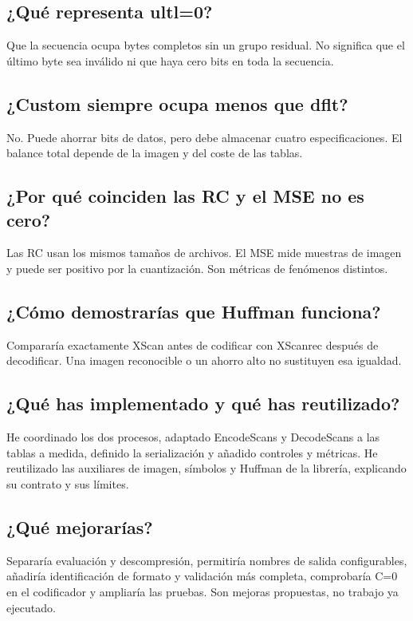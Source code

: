 \documentclass[11pt,a4paper,oneside]{report}
\begin{document}
\subsection{¿Qué representa ultl=0?}
Que la secuencia ocupa bytes completos sin un grupo residual. No significa que el último byte sea inválido ni que haya cero bits en toda la secuencia.

\subsection{¿Custom siempre ocupa menos que dflt?}
No. Puede ahorrar bits de datos, pero debe almacenar cuatro especificaciones. El balance total depende de la imagen y del coste de las tablas.

\subsection{¿Por qué coinciden las RC y el MSE no es cero?}
Las RC usan los mismos tamaños de archivos. El MSE mide muestras de imagen y puede ser positivo por la cuantización. Son métricas de fenómenos distintos.

\subsection{¿Cómo demostrarías que Huffman funciona?}
Compararía exactamente XScan antes de codificar con XScanrec después de decodificar. Una imagen reconocible o un ahorro alto no sustituyen esa igualdad.

\subsection{¿Qué has implementado y qué has reutilizado?}
He coordinado los dos procesos, adaptado EncodeScans y DecodeScans a las tablas a medida, definido la serialización y añadido controles y métricas. He reutilizado las auxiliares de imagen, símbolos y Huffman de la librería, explicando su contrato y sus límites.

\subsection{¿Qué mejorarías?}
Separaría evaluación y descompresión, permitiría nombres de salida configurables, añadiría identificación de formato y validación más completa, comprobaría C=0 en el codificador y ampliaría las pruebas. Son mejoras propuestas, no trabajo ya ejecutado.
\end{document}
